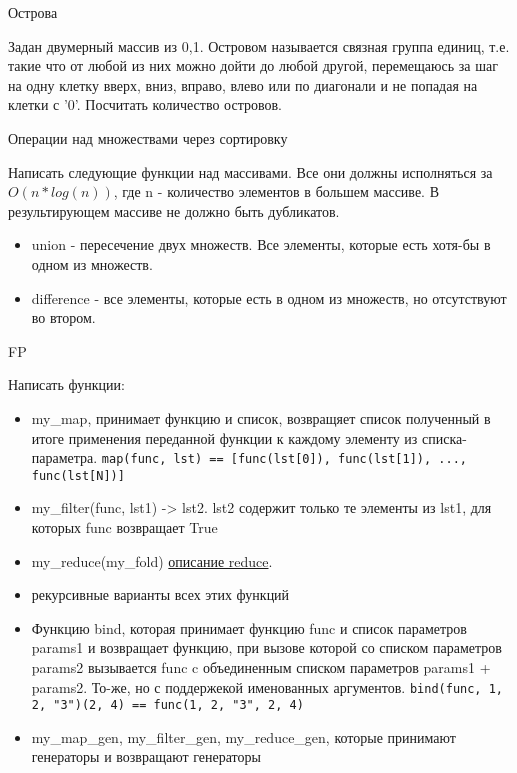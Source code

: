 \documentclass{article}
\begin{document}
\begin{center} Острова \end{center}
Задан двумерный массив из {0,1}. Островом называется связная группа единиц,
т.е. такие что от любой из них можно дойти до любой другой, перемещаюсь за шаг
на одну клетку вверх, вниз, вправо, влево или по диагонали и не попадая на 
клетки с '0'. Посчитать количество островов.
\newpage

\begin{center} Операции над множествами через сортировку \end{center}
Написать следующие функции над массивами. Все они должны исполняться за
$O(n * log(n))$, где n - количество элементов в большем массиве.
В результирующем массиве не должно быть дубликатов.
\begin{itemize}
    \item union - пересечение двух множеств. Все элементы, которые есть 
          хотя-бы в одном из множеств.
    \item difference - все элементы, которые есть в одном из множеств, 
          но отсутствуют во втором.
\end{itemize}
\newpage

\begin{center} FP \end{center}
Написать функции:
\begin{itemize}
    \item my\_map, принимает функцию и список, 
            возвращяет список полученный в итоге применения переданной функции 
            к каждому элементу из списка-параметра. 
            \lstinline!map(func, lst) == [func(lst[0]), func(lst[1]), ..., func(lst[N])]!
    \item my\_filter(func, lst1) -> lst2. lst2 содержит только те элементы из lst1,
          для которых func возвращает True
    \item my\_reduce(my\_fold) 
\href{http://ru.wikipedia.org/wiki/%D0%A1%D0%B2%D1%91%D1%80%D1%82%D0%BA%D0%B0_%D1%81%D0%BF%D0%B8%D1%81%D0%BA%D0%B0}{описание reduce}.
    \item рекурсивные варианты всех этих функций
    \item Функцию bind, которая принимает функцию func и список параметров params1
          и возвращает функцию, при вызове которой со списком параметров params2 вызывается
          func c объединенным списком параметров params1 + params2.
          То-же, но с поддержекой именованных аргументов.
          \lstinline!bind(func, 1, 2, "3")(2, 4) == func(1, 2, "3", 2, 4)!
    \item my\_map\_gen, my\_filter\_gen, my\_reduce\_gen, которые принимают генераторы и возвращают генераторы
\end{itemize}
\newpage
\end{document}
